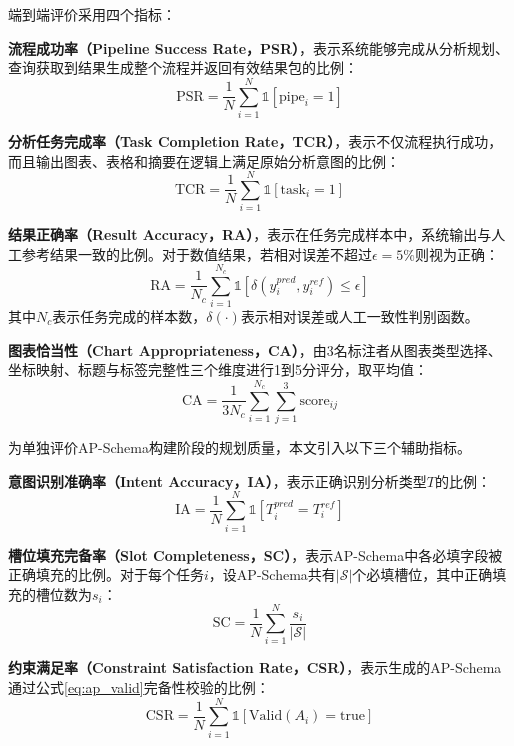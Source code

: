 端到端评价采用四个指标：

\textbf{流程成功率（Pipeline Success Rate，PSR）}，表示系统能够完成从分析规划、查询获取到结果生成整个流程并返回有效结果包的比例：
\begin{equation}
\text{PSR} = \frac{1}{N} \sum_{i=1}^{N} \mathbb{1}[\text{pipe}_i = 1]
\label{eq:psr}
\end{equation}

\textbf{分析任务完成率（Task Completion Rate，TCR）}，表示不仅流程执行成功，而且输出图表、表格和摘要在逻辑上满足原始分析意图的比例：
\begin{equation}
\text{TCR} = \frac{1}{N} \sum_{i=1}^{N} \mathbb{1}[\text{task}_i = 1]
\label{eq:tcr}
\end{equation}

\textbf{结果正确率（Result Accuracy，RA）}，表示在任务完成样本中，系统输出与人工参考结果一致的比例。对于数值结果，若相对误差不超过$\epsilon=5\%$则视为正确：
\begin{equation}
\text{RA} = \frac{1}{N_c} \sum_{i=1}^{N_c} \mathbb{1}[\delta(y_i^{pred}, y_i^{ref}) \leq \epsilon]
\label{eq:ra}
\end{equation}
其中$N_c$表示任务完成的样本数，$\delta(\cdot)$表示相对误差或人工一致性判别函数。

\textbf{图表恰当性（Chart Appropriateness，CA）}，由3名标注者从图表类型选择、坐标映射、标题与标签完整性三个维度进行1到5分评分，取平均值：
\begin{equation}
\text{CA} = \frac{1}{3N_c}\sum_{i=1}^{N_c}\sum_{j=1}^{3}\text{score}_{ij}
\label{eq:ca}
\end{equation}

为单独评价AP-Schema构建阶段的规划质量，本文引入以下三个辅助指标。

\textbf{意图识别准确率（Intent Accuracy，IA）}，表示正确识别分析类型$T$的比例：
\begin{equation}
\text{IA} = \frac{1}{N} \sum_{i=1}^{N} \mathbb{1}[T_i^{pred} = T_i^{ref}]
\label{eq:ia}
\end{equation}

\textbf{槽位填充完备率（Slot Completeness，SC）}，表示AP-Schema中各必填字段被正确填充的比例。对于每个任务$i$，设AP-Schema共有$|\mathcal{S}|$个必填槽位，其中正确填充的槽位数为$s_i$：
\begin{equation}
\text{SC} = \frac{1}{N} \sum_{i=1}^{N} \frac{s_i}{|\mathcal{S}|}
\label{eq:sc}
\end{equation}

\textbf{约束满足率（Constraint Satisfaction Rate，CSR）}，表示生成的AP-Schema通过公式\eqref{eq:ap_valid}完备性校验的比例：
\begin{equation}
\text{CSR} = \frac{1}{N} \sum_{i=1}^{N} \mathbb{1}[\text{Valid}(A_i) = \text{true}]
\label{eq:csr}
\end{equation}


